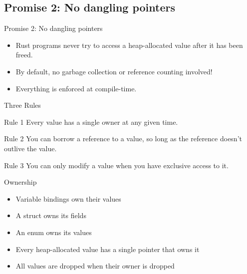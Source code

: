 \subsection{Promise 2: No dangling pointers}


\begin{frame}{Promise 2: No dangling pointers}

\begin{itemize}
	\item Rust programs never try to access a heap-allocated value after it has
		been freed.
	\item By default, no garbage collection or reference counting involved!
	\item Everything is enforced at compile-time.
\end{itemize}

\end{frame}


\begin{frame}[label={threerules}]{Three Rules}

\begin{block}{Rule 1}
Every value has a single owner at any given time.
\end{block}
\pause
\begin{block}{Rule 2}
You can borrow a reference to a value, so long as the
reference doesn’t outlive the value.
\end{block}
\pause
\begin{block}{Rule 3}
You can only modify a value when you have exclusive
access to it.
\end{block}

\end{frame}


\begin{frame}{Ownership}

\begin{itemize}
	\item Variable bindings own their values
	\item A struct owns its fields
	\item An enum owns its values
	\item Every heap-allocated value has a single pointer that owns it
	\item All values are dropped when their owner is dropped
\end{itemize}

\end{frame}

